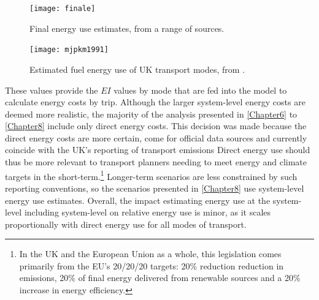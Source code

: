 \begin{figure}[h]
 \centering
 \texttt{[image: finale]}
 \caption{Final energy use estimates, from a range of sources.}
 \label{ffinale}
\end{figure}

\begin{figure}[h]
 \centering
 \texttt{[image: mjpkm1991]}
 \caption[Fuel energy use of UK transport modes, 1991]
 {Estimated fuel energy use of UK transport modes, from \citet{Hughes1991149}.}
 \label{fmjpkm1991}
\end{figure}

These values provide the $EI$ values by mode that are fed into the model
to calculate energy costs by trip. Although the larger system-level energy costs
are deemed more realistic, the majority of the analysis presented in \cref{Chapter6}
to \cref{Chapter8} include only direct energy costs. This decision was made
because the direct energy costs are more certain, come for official data sources and
currently coincide with the UK's reporting of transport emissions
Direct energy use should thus be more relevant to transport planners needing to meet energy and climate
targets in the short-term.\footnote{In
the UK and the European Union as a whole, this legislation
comes primarily from the EU's 20/20/20 targets: 20\% reduction reduction
in emissions, 20\% of final energy delivered from renewable sources and
a 20\% increase in energy efficiency.
}
Longer-term scenarios 
are less constrained by such reporting conventions, so the scenarios
presented in \cref{Chapter8} use system-level energy use estimates.
Overall, the impact estimating energy use at the system-level
including system-level on relative energy use is minor, as it scales
proportionally with direct energy use for all modes of transport.


